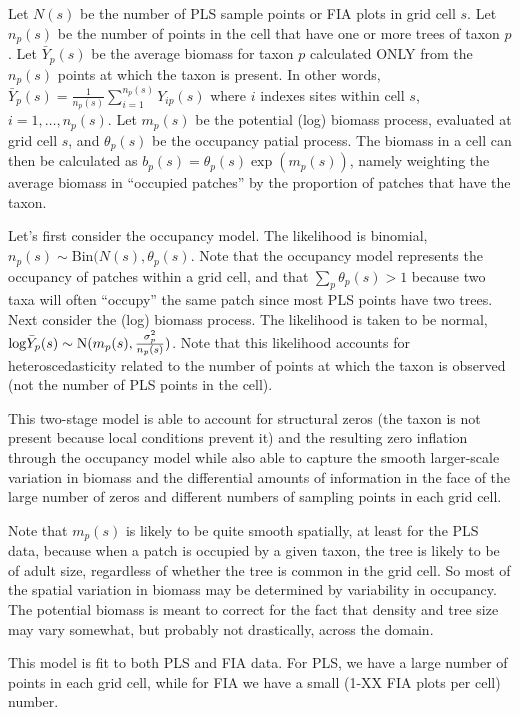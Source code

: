 \documentclass[12pt]{article}\usepackage[]{graphicx}\usepackage[]{color}
\begin{document}
Let $N(s)$ be the number of PLS sample points or FIA plots in grid
cell $s$. Let $n_{p}(s)$ be the number of points in the cell that
have one or more trees of taxon $p$. Let $\bar{Y}_{p}(s)$ be the
average biomass for taxon $p$ calculated ONLY from the $n_{p}(s)$
points at which the taxon is present. In other words, $\bar{Y}_{p}(s)=\frac{1}{n_{p}(s)}\sum_{i=1}^{n_{p}(s)}Y_{ip}(s)$
where $i$ indexes sites within cell $s$, $i=1,\ldots,n_{p}(s)$.
Let $m_{p}(s)$ be the potential (log) biomass process, evaluated
at grid cell $s$, and $\theta_{p}(s)$ be the occupancy patial process.
The biomass in a cell can then be calculated as $b_{p}(s)=\theta_{p}(s)\exp(m_{p}(s))$,
namely weighting the average biomass in \textquotedblleft occupied
patches\textquotedblright{} by the proportion of patches that have
the taxon. 

Let\textquoteright s first consider the occupancy model. The likelihood
is binomial, $n_{p}(s)\sim\mbox{Bin}(N(s),\theta_{p}(s)$. Note that
the occupancy model represents the occupancy of patches within a grid
cell, and that $\sum_{p}\theta_{p}(s)>1$ because two taxa will often
\textquotedblleft occupy\textquotedblright{} the same patch since
most PLS points have two trees. Next consider the (log) biomass process.
The likelihood is taken to be normal, $\mbox{\ensuremath{\log}}\bar{Y}_{p}(s)\sim\mbox{N}(m_{p}(s),\frac{\sigma_{p}^{2}}{n_{p}(s)})$.
Note that this likelihood accounts for heteroscedasticity related
to the number of points at which the taxon is observed (not the number
of PLS points in the cell). 

This two-stage model is able to account for structural zeros (the
taxon is not present because local conditions prevent it) and the
resulting zero inflation through the occupancy model while also able
to capture the smooth larger-scale variation in biomass and the differential
amounts of information in the face of the large number of zeros and
different numbers of sampling points in each grid cell.

Note that $m_{p}(s)$ is likely to be quite smooth spatially, at least
for the PLS data, because when a patch is occupied by a given taxon,
the tree is likely to be of adult size, regardless of whether the
tree is common in the grid cell. So most of the spatial variation
in biomass may be determined by variability in occupancy. The potential
biomass is meant to correct for the fact that density and tree size
may vary somewhat, but probably not drastically, across the domain.

This model is fit to both PLS and FIA data. For PLS, we have a large
number of points in each grid cell, while for FIA we have a small
(1-XX FIA plots per cell) number. 
\end{document}
